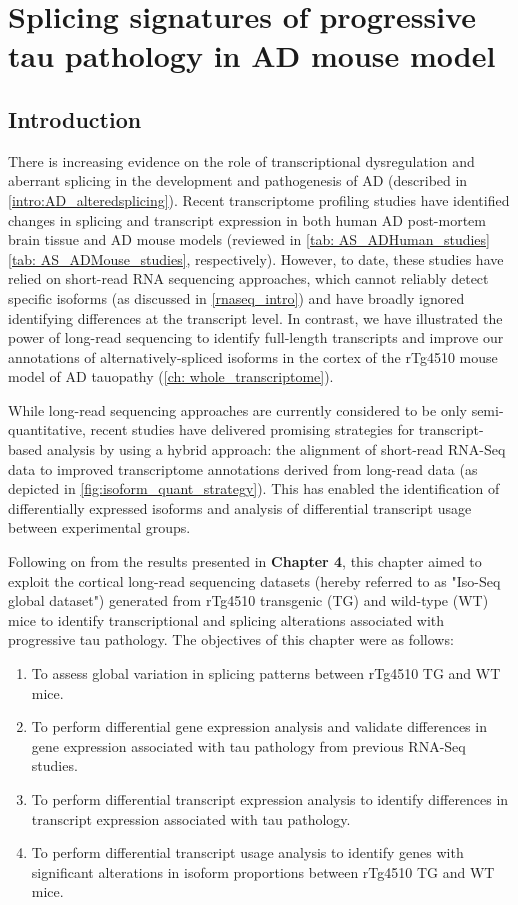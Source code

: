 \chapter{Splicing signatures of progressive tau pathology in AD mouse model}\label{ch: transcriptional_global_differences}

\section{Introduction}
There is increasing evidence on the role of transcriptional dysregulation and aberrant splicing in the development and pathogenesis of AD (described in \cref{intro:AD_alteredsplicing}). Recent transcriptome profiling studies have identified changes in splicing and transcript expression in both human AD post-mortem brain tissue and AD mouse models (reviewed in \cref{tab: AS_ADHuman_studies} \cref{tab: AS_ADMouse_studies}, respectively). However, to date, these studies have relied on short-read RNA sequencing approaches, which cannot reliably detect specific isoforms (as discussed in \cref{rnaseq_intro}) and have broadly ignored identifying differences at the transcript level. In contrast, we have illustrated the power of long-read sequencing to identify full-length transcripts and improve our annotations of alternatively-spliced isoforms in the cortex of the rTg4510 mouse model of AD tauopathy (\cref{ch: whole_transcriptome}). 

While long-read sequencing approaches are currently considered to be only semi-quantitative, recent studies have delivered promising strategies for transcript-based analysis by using a hybrid approach\cite{Tseng2021}: the alignment of short-read RNA-Seq data to improved transcriptome annotations derived from long-read data (as depicted in \cref{fig:isoform_quant_strategy}). This has enabled the identification of differentially expressed isoforms and analysis of differential transcript usage between experimental groups\cite{Tseng2021}. 

Following on from the results presented in \textbf{Chapter 4}, this chapter aimed to exploit the cortical long-read sequencing datasets (hereby referred to as "Iso-Seq global dataset") generated from rTg4510 transgenic (TG) and wild-type (WT) mice to identify transcriptional and splicing alterations associated with progressive tau pathology. The objectives of this chapter were as follows: 
\begin{enumerate}
	\item To assess global variation in splicing patterns between rTg4510 TG and WT mice.
	\item To perform differential gene expression analysis and validate differences in gene expression associated with tau pathology from previous RNA-Seq studies. 
	\item To perform differential transcript expression analysis to identify differences in transcript expression associated with tau pathology.   
	\item To perform differential transcript usage analysis to identify genes with significant alterations in isoform proportions between rTg4510 TG and WT mice. 
\end{enumerate} 

